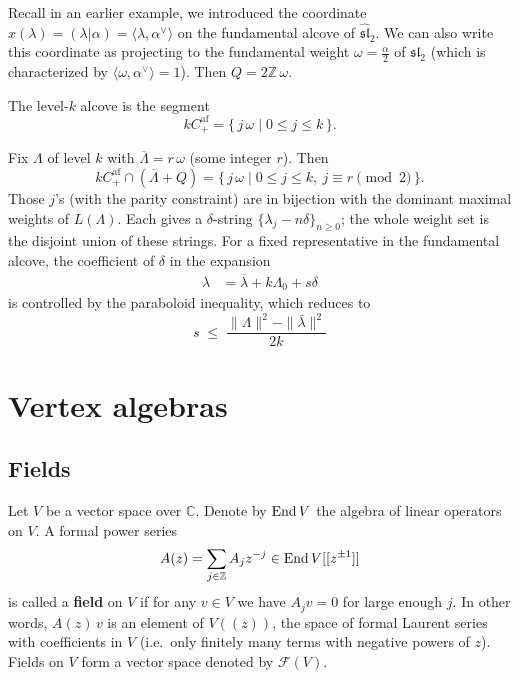 \documentclass[12pt]{article}
\begin{document}
\begin{example}
     Recall in an earlier example, we introduced the coordinate $x(\lambda) = (\lambda|\alpha) = \langle \lambda, \alpha^\vee \rangle$ on the fundamental alcove of $\widehat{\mathfrak{sl}}_2$. We can also write this coordinate as projecting to the fundamental weight $\omega = \frac{\alpha}{2}$ of $\mathfrak{sl}_2$ (which is characterized by $\langle \omega, \alpha^\vee \rangle = 1$). Then $Q=2\mathbb{Z}\,\omega$.

    The level-$k$ alcove is the segment
    \[
        kC^{\text{af}}_+ = \{\, j\,\omega \mid 0\le j\le k \,\}.
    \]

    Fix $\Lambda$ of level $k$ with $\overline{\Lambda}=r\,\omega$ (some integer $r$). Then
    \[
        kC^{\text{af}}_+\cap(\overline{\Lambda}+Q) = \{\, j\,\omega \mid 0\le j\le k,\ j\equiv r\pmod{2}\,\}.
    \]
    Those $j$'s (with the parity constraint) are in bijection with the dominant maximal weights of $L(\Lambda)$. Each gives a $\delta$-string $\{\lambda_j-n\delta\}_{n\ge0}$; the whole weight set is the disjoint union of these strings. For a fixed representative in the fundamental alcove, the coefficient of $\delta$ in the expansion \begin{align*}
        \lambda & = \overline{\lambda} + k\Lambda_0 + s \delta
    \end{align*} is controlled by the paraboloid inequality, which reduces to \[
        s\;\le\;\frac{\|\Lambda\|^2-\|\bar\lambda\|^2}{2k}
    \]
\end{example}

\section{Vertex algebras}
\subsection{Fields}
Let $V$ be a vector space over $\mathbb{C}$. Denote by $\operatorname{End} V$ the algebra of linear operators on $V$.
A formal power series
\begin{equation}\label{eq:field}
    A(z) = \sum_{j \in \mathbb{Z}} A_j z^{-j} \in \operatorname{End} V[[z^{\pm1}]]
\end{equation}
is called a \textbf{field} on $V$ if for any $v \in V$ we have $A_j v = 0$ for large enough $j$.
In other words, $A(z)\,v$ is an element of $V((z))$, the space of formal Laurent series with coefficients in $V$ (i.e.\ only finitely many terms with negative powers of $z$).
Fields on $V$ form a vector space denoted by $\mathcal{F}(V)$.
\end{document}

